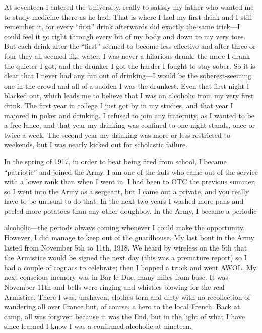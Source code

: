 \begin{biblechapter}
At seventeen I entered the University, really to satisfy my father who wanted me to study medicine there as he had. That is where I had my first drink and I still remember it, for every “first” drink afterwards did exactly the same trick—I could feel it go right through every bit of my body and down to my very toes. But each drink after the “first” seemed to become less effective and after three or four they all seemed like water. I was never a hilarious drunk; the more I drank the quieter I got, and the drunker I got the harder I fought to stay sober. So it is clear that I never had any fun out of drinking—I would be the soberest-seeming one in the crowd and all of a sudden I was the drunkest. Even that first night I blacked out, which leads me to believe that I was an alcoholic from my very first drink. The first year in college I just got by in my studies, and that year I majored in poker and drinking. I refused to join any fraternity, as I wanted to be a free lance, and that year my drinking was confined to one-night stands, once or twice a week. The second year my drinking was more or less restricted to weekends, but I was nearly kicked out for scholastic failure.

In the spring of 1917, in order to beat being fired from school, I became “patriotic” and joined the Army. I am one of the lads who came out of the service with a lower rank than when I went in. I had been to OTC the previous summer, so I went into the Army as a sergeant, but I came out a private, and you really have to be unusual to do that. In the next two years I washed more pans and peeled more potatoes than any other doughboy. In the Army, I became a periodic

alcoholic—the periods always coming whenever I could make the opportunity. However, I did manage to keep out of the guardhouse. My last bout in the Army lasted from November 5th to 11th, 1918. We heard by wireless on the 5th that the Armistice would be signed the next day (this was a premature report) so I had a couple of cognacs to celebrate; then I hopped a truck and went AWOL. My next conscious memory was in Bar le Duc, many miles from base. It was November 11th and bells were ringing and whistles blowing for the real Armistice. There I was, unshaven, clothes torn and dirty with no recollection of wandering all over France but, of course, a hero to the local French. Back at camp, all was forgiven because it was the End, but in the light of what I have since learned I know I was a confirmed alcoholic at nineteen.


\end{biblechapter}

